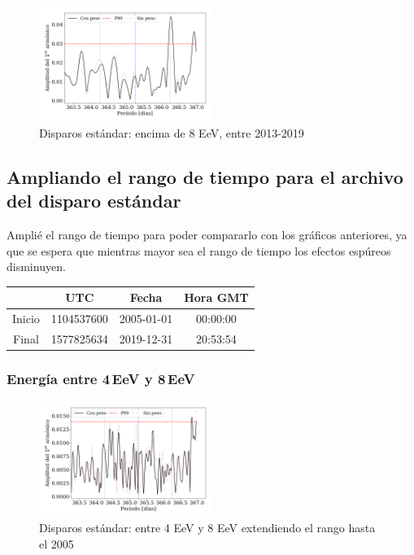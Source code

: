 \begin{figure}[H]
	\centering
	\includegraphics[width=0.5\textwidth]{Graficos/2019_Main_Array_8_EeV_con_vs_sin_peso.png}
	\caption{Disparos estándar: encima de 8 EeV, entre 2013-2019}
	\label{fig:8w}
\end{figure}




\subsection{Ampliando el rango de tiempo para el archivo del disparo estándar}

Amplié el rango de tiempo para poder compararlo con los gráficos anteriores, ya que se espera que mientras mayor sea el rango de tiempo los efectos espúreos disminuyen.

	\begin{table}[H]
	\centering
		\begin{tabular}{c|c|c|c}
	 		& UTC 			& Fecha		 	&  Hora GMT  \\ \hline
	Inicio	& 1104537600	&2005-01-01 	&00:00:00		\\
	Final 	& 1577825634	&2019-12-31 	&20:53:54		\\
		\end{tabular}
	\end{table}


\subsubsection{Energía entre 4\,EeV y 8\,EeV}

\begin{figure}[H]
	\centering
	\includegraphics[width=0.5\textwidth]{Graficos/2019_Main_Array_4_8_EeV_con_vs_sin_peso_extended.png}
	\caption{Disparos estándar: entre 4 EeV y 8 EeV extendiendo el rango hasta el 2005}
	\label{fig:48w_extended}
\end{figure}

